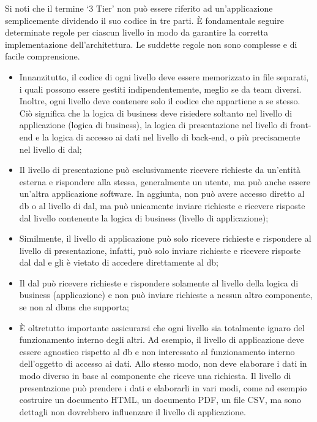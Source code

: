 Si noti che il termine `3 Tier' non può essere riferito ad un'applicazione semplicemente dividendo il suo codice in tre parti. È fondamentale seguire determinate regole per ciascun livello in modo da garantire la corretta implementazione dell'architettura. Le suddette regole non sono complesse e di facile comprensione.
\begin{itemize}
\item Innanzitutto, il codice di ogni livello deve essere memorizzato in file separati, i quali possono essere gestiti indipendentemente, meglio se da team diversi. Inoltre, ogni livello deve contenere solo il codice che appartiene a se stesso. Ciò significa che la logica di business deve risiedere soltanto nel livello di applicazione (logica di business), la logica di presentazione nel livello di front-end e la logica di accesso ai dati nel livello di back-end, o più precisamente nel livello di \acrfull{dal};
\item Il livello di presentazione può esclusivamente ricevere richieste da un'entità esterna e rispondere alla stessa, generalmente un utente, ma può anche essere un'altra applicazione software. In aggiunta, non può avere accesso diretto al \acrlong{db} o al livello di \acrlong{dal}, ma può unicamente inviare richieste e ricevere risposte dal livello contenente la logica di business (livello di applicazione);
\item Similmente, il livello di applicazione può solo ricevere richieste e rispondere al livello di presentazione, infatti, può solo inviare richieste e ricevere risposte dal \acrlong{dal} e gli è vietato di accedere direttamente al \acrlong{db};
\item Il \acrfull{dal} può ricevere richieste e rispondere solamente al livello della logica di business (applicazione) e non può inviare richieste a nessun altro componente, se non al \acrlong{dbms} che supporta;
\item È oltretutto importante assicurarsi che ogni livello sia totalmente ignaro del funzionamento interno degli altri. Ad esempio, il livello di applicazione deve essere agnostico rispetto al \acrlong{db} e non interessato al funzionamento interno dell'oggetto di accesso ai dati. Allo stesso modo, non deve elaborare i dati in modo diverso in base al componente che riceve una richiesta. Il livello di presentazione può prendere i dati e elaborarli in vari modi, come ad esempio costruire un documento HTML, un documento PDF, un file CSV, ma sono dettagli non dovrebbero influenzare il livello di applicazione.
\end{itemize}


